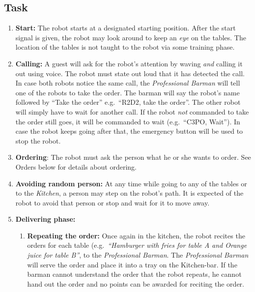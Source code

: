 \subsection{Task}
\begin{enumerate}
	\item \textbf{Start:} The robot starts at a designated starting position. After the start signal is given, the robot may look around to keep an \textit{eye} on the tables.
	  The location of the tables is not taught to the robot via some training phase.

	\item \textbf{Calling:} A guest will ask for the robot's attention by waving \emph{and} calling it out using voice.
	  The robot must state out loud that it has detected the call.
	  In case both robots notice the same call, the \textit{Professional Barman} will tell one of the robots to take the order.
	  The barman will say the robot's name followed by \enquote{Take the order} e.g.~\enquote{R2D2, take the order}.
	  The other robot will simply have to wait for another call.
	  If the robot \textit{not} commanded to take the order still goes, it will be commanded to wait (e.g.~\enquote{C3PO, Wait}).
	  In case the robot keeps going after that, the emergency button will be used to stop the robot.


	\item \textbf{Ordering}: The robot must ask the person what he or she wants to order. See Orders below for details about ordering.
	\item \textbf{Avoiding random person:} At any time while going to any of the tables or to the \textit{Kitchen}, a person may step on the robot's path.
	  It is expected of the robot to avoid that person or stop and wait for it to move away.

	\item \textbf{Delivering phase:}
	\begin{enumerate}
		\item \textbf{Repeating the order:} Once again in the kitchen, the robot recites the orders for each table (e.g.~\textit{\enquote{Hamburger with fries for table A and Orange juice for table B}}, to the \textit{Professional Barman}.
		  The \textit{Professional Barman} will serve the order and place it into a tray on the Kitchen-bar.
		  If the barman cannot understand the order that the robot repeats, he cannot hand out the order and no points can be awarded for reciting the order.


\end{enumerate}
\end{enumerate}
